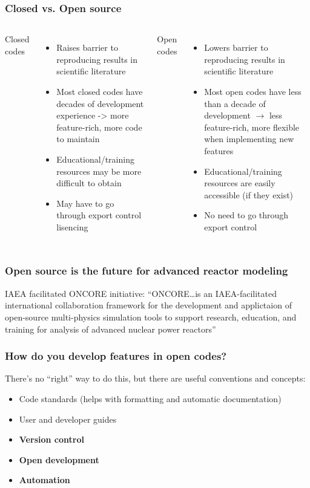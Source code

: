 \begin{frame}
    \frametitle{Closed vs. Open source}
    \begin{columns}
        \column[t]{5cm}
        Closed codes
        \begin{itemize}
            \item Raises barrier to reproducing results in scientific literature
            \item Most closed codes have decades of development experience -> more feature-rich, more code to maintain
            \item Educational/training resources may be more difficult to obtain
            \item May have to go through export control lisencing
        \end{itemize}


        \column[t]{5cm}
        Open codes
        \begin{itemize}
            \item Lowers barrier to reproducing results in scientific literature
            \item Most open codes have less than a decade of development $\rightarrow$ less feature-rich, more flexible when implementing new features
            \item Educational/training resources are easily accessible (if they exist)
            \item No need to go through export control
        \end{itemize}
    \end{columns}

\end{frame}

\begin{frame}
    \frametitle{Open source is the future for advanced reactor modeling}
    \Gls{IAEA} facilitated \Gls{ONCORE} initiative\cite{fiorina_initiative_2021}:
    \newline
    \newline
    \noindent ``ONCORE\ldots is an IAEA-facilitated international collaboration framework for the development and applictaion of open-source multi-physics simulation tools to support research, education, and training for analysis of advanced nuclear power reactors''\cite{iaea_open-source}

\end{frame}

\begin{frame}[t]
    \frametitle{How do you develop features in open codes?}

    There's no ``right'' way to do this, but there are useful conventions and concepts:
    \begin{itemize}
        \item Code standards (helps with formatting and automatic documentation)
        \item User and developer guides
        \item {\bf Version control}
        \item {\bf Open development}
        \item {\bf Automation}
    \end{itemize}
\end{frame}

